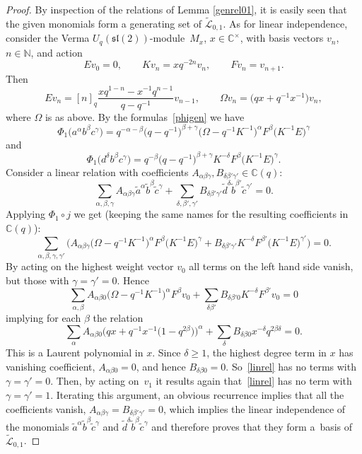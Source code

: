 \documentclass[pdftex]{sigma}%
\numberwithin{equation}{section}
\numberwithin{figure}{section}
\newcommand{\mc}{\mathbb{C}}
\newcommand{\mn}{\mathbb{N}}
\newcommand{\Ll}{{\mathcal L}}
\begin{document}
\begin{proof} By inspection of the relations of Lemma \ref{genrel01}, it is easily seen that the given monomials form a generating set of $\tilde{\Ll}_{0,1}$. As for linear independence, consider the Verma $U_q({\mathfrak{sl}}(2))$-module~$M_x$, $x\in {\mathbb C}^{\times}$, with basis vectors $v_n$, $n\in \mn$, and action
\[Ev_0=0,\qquad Kv_n=x q^{-2n}v_n,\qquad Fv_n=v_{n+1}.\]
Then
\[Ev_n = [n]_q \frac{xq^{1-n}-x^{-1}q^{n-1}}{q-q^{-1}}v_{n-1},\qquad \Omega v_n = \big(qx+q^{-1}x^{-1}\big)v_n,\]
where $\Omega$ is as above. By the formulas~\eqref{phigen} we have
\[\Phi_1\big(a^\alpha b^\beta c^\gamma\big) = q^{-\alpha-\beta}\big(q-q^{-1}\big)^{\beta+\gamma} \big(\Omega-q^{-1}K^{-1}\big)^\alpha F^\beta\big(K^{-1}E\big)^\gamma\]
and
\[\Phi_1\big(d^\delta b^\beta c^\gamma\big) = q^{-\beta}\big(q-q^{-1}\big)^{\beta+\gamma} K^{-\delta} F^\beta\big(K^{-1}E\big)^\gamma.\]
Consider a linear relation with coefficients $A_{\alpha\beta\gamma},B_{\delta\beta'\gamma'}\in \mc(q)$:
\[\sum_{\alpha,\beta,\gamma}A_{\alpha\beta\gamma} \tilde{a}^\alpha \tilde{b}^\beta \tilde{c}^\gamma+
\sum_{\delta,\beta',\gamma'} B_{\delta\beta'\gamma'}\tilde{d}^\delta \tilde{b}^{\beta'} \tilde{c}^{\gamma'}=0.\]
Applying $\Phi_1\circ j$ we get (keeping the same names for the resulting coefficients in $\mc(q)$):
\begin{equation}\label{linrel}
\sum_{\alpha,\beta,\gamma,\gamma'}\big(A_{\alpha\beta\gamma} \big(\Omega-q^{-1}K^{-1}\big)^\alpha F^\beta\big(K^{-1}E\big)^\gamma + B_{\delta\beta'\gamma'} K^{-\delta} F^{\beta'}\big(K^{-1}E\big)^{\gamma'} \big)=0.
\end{equation}
By acting on the highest weight vector $v_0$ all terms on the left hand side vanish, but those with $\gamma=\gamma'=0$. Hence
\[
\sum_{\alpha,\beta}A_{\alpha\beta 0} \big(\Omega-q^{-1}K^{-1}\big)^\alpha F^\beta v_0 + \sum_{\delta\beta'}B_{\delta\beta'0} K^{-\delta} F^{\beta'} v_0 =0
\]
implying for each $\beta$ the relation
\[\sum_{\alpha}A_{\alpha\beta 0} \big(qx+q^{-1}x^{-1}\big(1-q^{2\beta}\big)\big)^\alpha + \sum_{\delta}B_{\delta\beta 0} x^{-\delta}q^{2\beta \delta}=0.\]
This is a Laurent polynomial in $x$. Since $\delta\geq 1$, the highest degree term in $x$ has vanishing coefficient, $A_{\alpha\beta 0}=0$, and hence $B_{\delta\beta0}=0$. So~\eqref{linrel} has no terms with $\gamma=\gamma'=0$. Then, by acting on~$v_1$ it results again that~\eqref{linrel} has no term with $\gamma=\gamma'=1$. Iterating this argument, an obvious recurrence implies that all the coefficients vanish, $A_{\alpha\beta\gamma} = B_{\delta\beta'\gamma'}=0$, which implies the linear independence of the monomials $\tilde{a}^\alpha \tilde{b}^\beta \tilde{c}^\gamma$ and $\tilde{d}^\delta \tilde{b}^\beta \tilde{c}^\gamma$ and therefore proves that they form a~basis of $\tilde{\Ll}_{0,1}$.


\end{proof}
\end{document}
